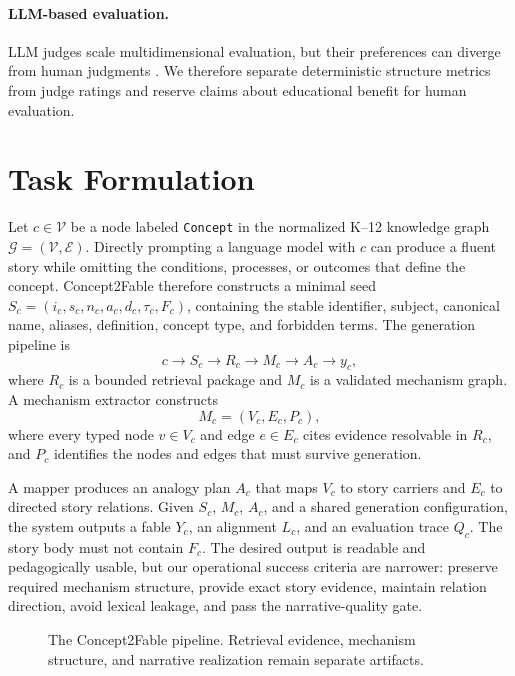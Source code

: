 \documentclass[letterpaper]{article} %
\begin{document}
\paragraph{LLM-based evaluation.}
LLM judges scale multidimensional evaluation, but their preferences can diverge from human judgments \citep{zheng2023judging}. We therefore separate deterministic structure metrics from judge ratings and reserve claims about educational benefit for human evaluation.

\section{Task Formulation}

Let $c\in\mathcal{V}$ be a node labeled \texttt{Concept} in the normalized K--12 knowledge graph $\mathcal{G}=(\mathcal{V},\mathcal{E})$. Directly prompting a language model with $c$ can produce a fluent story while omitting the conditions, processes, or outcomes that define the concept. Concept2Fable therefore constructs a minimal seed $S_c=(i_c,s_c,n_c,a_c,d_c,\tau_c,F_c)$, containing the stable identifier, subject, canonical name, aliases, definition, concept type, and forbidden terms. The generation pipeline is
\[
c\rightarrow S_c\rightarrow R_c\rightarrow M_c\rightarrow A_c\rightarrow y_c,
\]
where $R_c$ is a bounded retrieval package and $M_c$ is a validated mechanism graph. A mechanism extractor constructs
\[
M_c=(V_c,E_c,P_c),
\]
where every typed node $v\in V_c$ and edge $e\in E_c$ cites evidence resolvable in $R_c$, and $P_c$ identifies the nodes and edges that must survive generation.

A mapper produces an analogy plan $A_c$ that maps $V_c$ to story carriers and $E_c$ to directed story relations. Given $S_c$, $M_c$, $A_c$, and a shared generation configuration, the system outputs a fable $Y_c$, an alignment $L_c$, and an evaluation trace $Q_c$. The story body must not contain $F_c$. The desired output is readable and pedagogically usable, but our operational success criteria are narrower: preserve required mechanism structure, provide exact story evidence, maintain relation direction, avoid lexical leakage, and pass the narrative-quality gate.

\begin{figure}[t]
\centering
{}
\caption{The Concept2Fable pipeline. Retrieval evidence, mechanism structure, and narrative realization remain separate artifacts.}
\label{fig:pipeline}
\end{figure}
\end{document}
